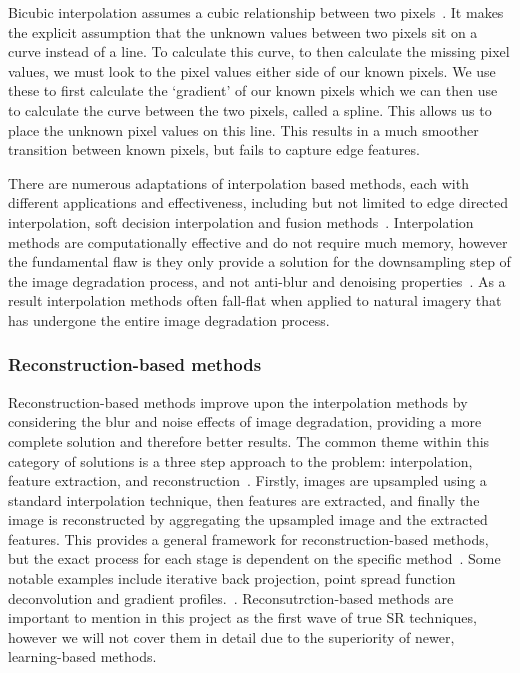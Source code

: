 Bicubic interpolation assumes a cubic relationship between two pixels~\cite{bicubicInterpolation}. It makes the explicit assumption that the unknown values between two pixels sit on a curve instead of a line. To calculate this curve, to then calculate the missing pixel values, we must look to the pixel values either side of our known pixels. We use these to first calculate the `gradient' of our known pixels which we can then use to calculate the curve between the two pixels, called a spline. This allows us to place the unknown pixel values on this line. This results in a much smoother transition between known pixels, but fails to capture edge features.

There are numerous adaptations of interpolation based methods, each with different applications and effectiveness, including but not limited to edge directed interpolation, soft decision interpolation and fusion methods~\cite{interpolation}. Interpolation methods are computationally effective and do not require much memory, however the fundamental flaw is they only provide a solution for the downsampling step of the image degradation process, and not anti-blur and denoising properties~\cite{interpolation}. As a result interpolation methods often fall-flat when applied to natural imagery that has undergone the entire image degradation process. 

\subsubsection{Reconstruction-based methods}
Reconstruction-based methods improve upon the interpolation methods by considering the blur and noise effects of image degradation, providing a more complete solution and therefore better results. The common theme within this category of solutions is a three step approach to the problem: interpolation, feature extraction, and reconstruction~\cite{superResRemoteSensingOverview}. Firstly, images are upsampled using a standard interpolation technique, then features are extracted, and finally the image is reconstructed by aggregating the upsampled image and the extracted features. This provides a general framework for reconstruction-based methods, but the exact process for each stage is dependent on the specific method~\cite{superResRemoteSensingOverview}. Some notable examples include iterative back projection, point spread function deconvolution and gradient profiles.~\cite{superResRemoteSensingOverview}. Reconsutrction-based methods are important to mention in this project as the first wave of true SR techniques, however we will not cover them in detail due to the superiority of newer, learning-based methods.

